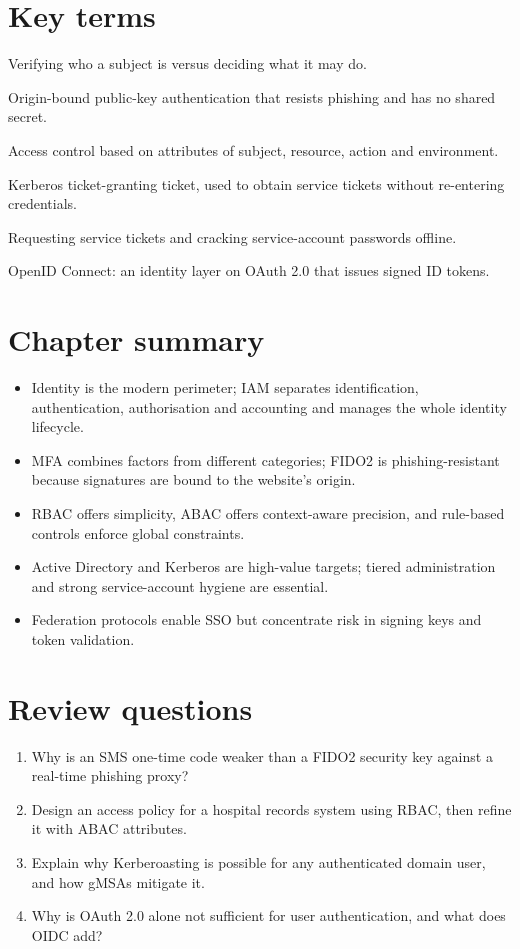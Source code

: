 \documentclass[11pt,openany]{book}
\begin{document}
\section*{Key terms}
\begin{description}[style=nextline,leftmargin=1.2em]
  \item[Authentication vs. authorisation] Verifying who a subject is versus deciding what it may do.
  \item[FIDO2 / passkey] Origin-bound public-key authentication that resists phishing and has no shared secret.
  \item[ABAC] Access control based on attributes of subject, resource, action and environment.
  \item[TGT] Kerberos ticket-granting ticket, used to obtain service tickets without re-entering credentials.
  \item[Kerberoasting] Requesting service tickets and cracking service-account passwords offline.
  \item[OIDC] OpenID Connect: an identity layer on OAuth 2.0 that issues signed ID tokens.
\end{description}

\section*{Chapter summary}
\begin{itemize}
  \item Identity is the modern perimeter; IAM separates identification, authentication, authorisation and accounting and manages the whole identity lifecycle.
  \item MFA combines factors from different categories; FIDO2 is phishing-resistant because signatures are bound to the website's origin.
  \item RBAC offers simplicity, ABAC offers context-aware precision, and rule-based controls enforce global constraints.
  \item Active Directory and Kerberos are high-value targets; tiered administration and strong service-account hygiene are essential.
  \item Federation protocols enable SSO but concentrate risk in signing keys and token validation.
\end{itemize}

\section*{Review questions}
\begin{enumerate}
  \item Why is an SMS one-time code weaker than a FIDO2 security key against a real-time phishing proxy?
  \item Design an access policy for a hospital records system using RBAC, then refine it with ABAC attributes.
  \item Explain why Kerberoasting is possible for any authenticated domain user, and how gMSAs mitigate it.
  \item Why is OAuth 2.0 alone not sufficient for user authentication, and what does OIDC add?
\end{enumerate}
\end{document}
